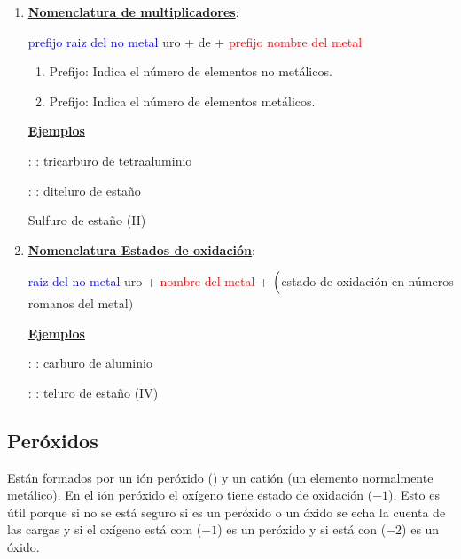 \documentclass[12pt]{article}
\begin{document}
\begin{enumerate}[label=\itembolascolor{\arabic*}{blue}]
    \item \textbf{\uline{Nomenclatura de multiplicadores}}:
          \begin{center}
              \textcolor{blue}{prefijo} \textcolor{blue}{raiz del no metal} \textcolor{mygreen}{uro} + de + \textcolor{red}{prefijo} \textcolor{red}{nombre del metal}
          \end{center}

          \begin{enumerate}[label=\textcolor{red}{$\bullet$}]
              \item Prefijo: Indica el número de elementos no metálicos.
              \item Prefijo: Indica el número de elementos metálicos.
          \end{enumerate}

          \textbf{\uline{Ejemplos}}

           : : tricarburo de tetraaluminio

           : : diteluro de estaño

          Sulfuro de estaño (II) \ch{->}   \ch{->}  \ch{->} 

    \item \textbf{\uline{Nomenclatura Estados de oxidación}}:
          \begin{center}
              \textcolor{blue}{raiz del no metal} \textcolor{mygreen}{uro}  + \textcolor{red}{nombre del metal} + $\Bigl($\textcolor{green!50!black}{estado de oxidación en números romanos del metal}$\Bigr)$
          \end{center}

          \textbf{\uline{Ejemplos}}

           : : carburo de aluminio

           : : teluro de estaño (IV)
\end{enumerate}

\subsection{Peróxidos}

Están formados por un ión peróxido () y un catión (un elemento normalmente metálico). En el ión peróxido el oxígeno tiene estado de oxidación ($-1$). Esto es útil porque si no se está seguro si es un peróxido o un óxido se echa la cuenta de las cargas y si el oxígeno está com ($-1$) es un peróxido y si está con ($-2$) es un óxido.
\end{document}
